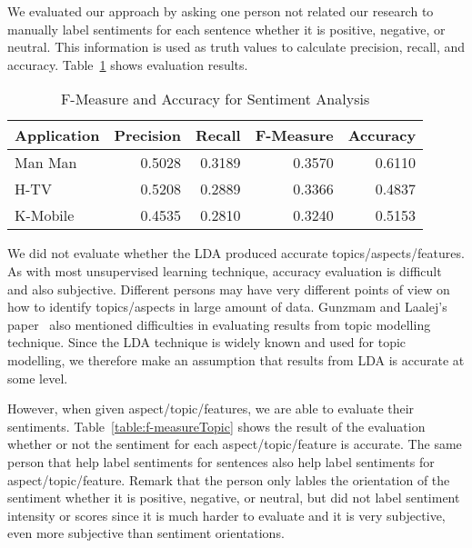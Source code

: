 We evaluated our approach by asking one person not related our research to manually label sentiments for each sentence whether it is positive, negative, or neutral. This information is used as truth values to calculate precision, recall, and accuracy. Table~\ref{table:f-measureSenti} shows evaluation results.

\begin{table}[h]
	\caption{F-Measure and Accuracy for Sentiment Analysis}
	\label{table:f-measureSenti}
	\centering
	\begin{tabular}{|l|r|r|r|r|}
		\hline
		\multicolumn{1}{|c|}{\textbf{Application}} &
		\multicolumn{1}{|c|}{\textbf{Precision}} &
		\multicolumn{1}{|c|}{\textbf{Recall}} &
		\multicolumn{1}{|c|}{\textbf{F-Measure}} &
		\multicolumn{1}{|c|}{\textbf{Accuracy}} \\
		\hline
		Man Man & 0.5028 & 0.3189 & 0.3570 & 0.6110\\
		\hline
		H-TV & 0.5208 & 0.2889 & 0.3366 & 0.4837 \\
		\hline
		K-Mobile & 0.4535 & 0.2810 & 0.3240 & 0.5153 \\
		\hline
	\end{tabular}
\end{table}

We did not evaluate whether the LDA produced accurate topics/aspects/features. As with most unsupervised learning technique, accuracy evaluation is difficult and also subjective. Different persons may have very different points of view on how to identify topics/aspects in large amount of data. Gunzmam and Laalej's paper~\cite{userslikefeature} also mentioned difficulties in evaluating results from topic modelling technique. Since the LDA technique is widely known and used for topic modelling, we therefore make an assumption that results from LDA is accurate at some level. 

However, when given aspect/topic/features, we are able to evaluate their sentiments. Table~\ref{table:f-measureTopic} shows the result of the evaluation whether or not the sentiment for each aspect/topic/feature is accurate. The same person that help label sentiments for sentences also help label sentiments for aspect/topic/feature. Remark that the person only lables the orientation of the sentiment whether it is positive, negative, or neutral, but did not label sentiment intensity or scores since it is much harder to evaluate and it is very subjective, even more subjective than sentiment orientations.

